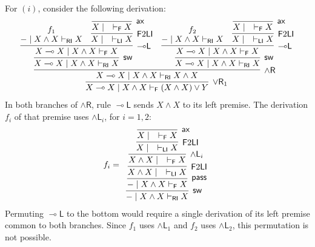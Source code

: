 \documentclass[submission,copyright,creativecommons]{eptcs}
\theoremstyle{definition}
\newcommand{\lleft}{{\multimap}\mathsf{L}}
\newcommand{\pass}{\mathsf{pass}}
\newcommand{\andlone}{\land \mathsf{L}_{1}}
\newcommand{\andltwo}{\land \mathsf{L}_{2}}
\newcommand{\andli}{\land \mathsf{L}_{i}}
\newcommand{\andr}{\land \mathsf{R}}
\newcommand{\orrone}{\lor \mathsf{R}_{1}}
\newcommand{\ax}{\mathsf{ax}}
\newcommand{\lolli}{\multimap}
\newcommand{\RI}{\mathsf{RI}}
\newcommand{\LI}{\mathsf{LI}}
\newcommand{\F}{\mathsf{F}}
\newcommand{\sw}{\mathsf{sw}}
\begin{document}
For $(i)$, consider the following derivation:
\begin{equation}\label{eq:ex:lleft:sameCxt:diffDer}
  \begin{array}{l}
    \infer[\orrone]{X \lolli X \mid X \land X \vdash_\F (X \land X) \lor Y}{
    \infer[\andr]{X \lolli X \mid X \land X \vdash_\RI X \land X}{
      \infer[\sw]{X \lolli X \mid X \land X \vdash_\RI X}{
        \infer[\lleft]{X \lolli X \mid X \land X \vdash_\F X}{
          \deduce{{-} \mid X \land X \vdash_\RI X}{f_1} &
          \infer[\F 2 \LI]{X \mid \quad \vdash_\LI X}{\infer[\ax]{X \mid \quad \vdash_\F X}{}}
        }
      } &
      \infer[\sw]{X \lolli X \mid X \land X \vdash_\RI X}{
        \infer[\lleft]{X \lolli X \mid X \land X \vdash_\F X}{
          \deduce{{-} \mid X \land X \vdash_\RI X}{f_2} &
          \infer[\F 2 \LI]{X \mid \quad \vdash_\LI X}{\infer[\ax]{X \mid \quad \vdash_\F X}{}}
        }
      }
    }
  }
  \end{array}
\end{equation}
In both branches of $\andr$, rule $\lleft$ sends $X \land X$ to its left premise. The derivation $f_i$ of that premise uses $\andli$, for $i=1,2$:
\[
  f_i =
  \begin{array}{c}
    \infer[\sw]{{-} \mid X \land X \vdash_\RI X}{
    \infer[\pass]{{-} \mid X \land X \vdash_\F X}{
      \infer[\F 2 \LI]{X \land X \mid \quad \vdash_\LI X}{
        \infer[\andli]{X \land X \mid \quad \vdash_\F X}{
          \infer[\F 2 \LI]{X \mid \quad \vdash_\LI X}{\infer[\ax]{X \mid \quad \vdash_\F X}{}}
        }
      }
    }
  }
  \end{array}
\]
Permuting $\lleft$ to the bottom would require a single derivation of its left premise common to both branches. Since $f_1$ uses $\andlone$ and $f_2$ uses $\andltwo$, this permutation is not possible.
\end{document}
